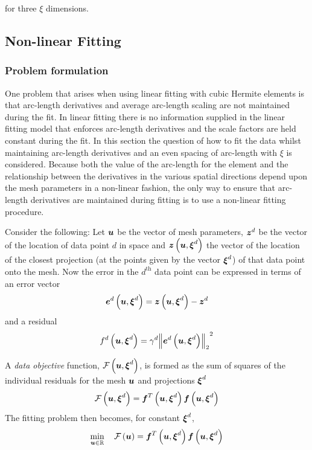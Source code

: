 for three $\xi$ dimensions.

\subsection{Non-linear Fitting}
\label{sec:nonlinearfitting} 

\subsubsection{Problem formulation}
\label{sec:problemformulation}

One problem that arises when using linear fitting with cubic Hermite elements is
that arc-length derivatives and average arc-length scaling are not maintained during
the fit. In linear fitting there is no information supplied in the linear
fitting model that enforces arc-length derivatives and the scale factors are held
constant during the fit. In this section the question of how to fit the data
whilst maintaining arc-length derivatives and an even spacing of arc-length with
$\xi$ is considered.  Because both the value of the arc-length for the element
and the relationship between the derivatives in the various spatial directions
depend upon the mesh parameters in a non-linear fashion, the only way to ensure
that arc-length derivatives are maintained during fitting is to use a non-linear
fitting procedure.

Consider the following: Let $\boldsymbol{u}$ be the vector of mesh parameters,
$\boldsymbol{z}^{d}$ be the vector of the location of data point $d$ in space
and $ \boldsymbol{z}\left( \boldsymbol{u},\boldsymbol{\xi}^{d} \right) $ the vector of the location
of the closest projection (at the points given by the vector
$\boldsymbol{\xi}^{d}$) of that data point onto the mesh. Now the error in the
$d^{\text{th}}$ data point can be expressed in terms of an error vector
\begin{equation}
  \fnof{\vectr{e}^{d}}{\vectr{u},\vectr{\xi}^{d}}=\fnof{\vectr{z}}
  {\vectr{u},\vectr{\xi}^{d}}-\vectr{z}^{d}
  \label{eqn:errorvector}
\end{equation}
and a residual
\begin{equation}
  \fnof{f^{d}}{\vectr{u},\vectr{\xi}^{d}}=\gamma^{d}\norm{\fnof{
      \vectr{e}^{d}}{\vectr{u},\vectr{\xi}^{d}}}^{2}
  \label{eqn:dataresidual}
\end{equation}

A \emph{data objective} function,
$ \mathcal{F}\left( \boldsymbol{u},\boldsymbol{\xi}^{d} \right) $, is formed as the sum of
squares of the individual residuals for the mesh $\boldsymbol{u}$ and projections
$\boldsymbol{\xi}^{d}$
\begin{equation}
  \fnof{\mathcal{F}}{\vectr{u},\vectr{\xi}^{d}}=\fntof{\vectr{f}}{\vectr{u},
    \vectr{\xi}^{d}}\fnof{\vectr{f}}{\vectr{u},\vectr{\xi}^{d}}
  \label{eqn:nldataresidualfn}
\end{equation}
The fitting problem then becomes, for constant $\boldsymbol{\xi}^{d}$,
\begin{equation}
  \min_{\boldsymbol{u} \in \mathbb{R}} \quad  \mathcal{F}\left( \boldsymbol{u} \right) = {\boldsymbol{f}}^{T}\left( \boldsymbol{u},\boldsymbol{\xi}^{d} \right)  \boldsymbol{f}\left( \boldsymbol{u},\boldsymbol{\xi}^{d} \right) 
\end{equation}

